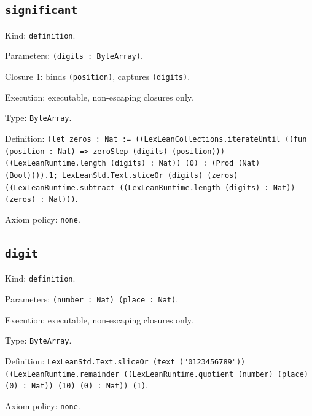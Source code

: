 \documentclass[11pt]{article}
\begin{document}
\subsection*{\texttt{significant}}
\noindent Kind: \texttt{definition}.\par
\noindent Parameters: \texttt{(digits : ByteArray)}.\par
\noindent Closure 1: binds \texttt{(position)}, captures \texttt{(digits)}.\par
\noindent Execution: executable, non-escaping closures only.\par
\noindent Type: \texttt{ByteArray}.\par
\noindent Definition: \texttt{(let zeros : Nat := ((LexLeanCollections.iterateUntil ((fun (position : Nat) => zeroStep (digits) (position))) ((LexLeanRuntime.length (digits) : Nat)) (0) : (Prod (Nat) (Bool)))).1; LexLeanStd.Text.sliceOr (digits) (zeros) ((LexLeanRuntime.subtract ((LexLeanRuntime.length (digits) : Nat)) (zeros) : Nat)))}.\par
\noindent Axiom policy: \texttt{none}.\par
\subsection*{\texttt{digit}}
\noindent Kind: \texttt{definition}.\par
\noindent Parameters: \texttt{(number : Nat) (place : Nat)}.\par
\noindent Execution: executable, non-escaping closures only.\par
\noindent Type: \texttt{ByteArray}.\par
\noindent Definition: \texttt{LexLeanStd.Text.sliceOr (text ("0123456789")) ((LexLeanRuntime.remainder ((LexLeanRuntime.quotient (number) (place) (0) : Nat)) (10) (0) : Nat)) (1)}.\par
\noindent Axiom policy: \texttt{none}.\par
\end{document}
